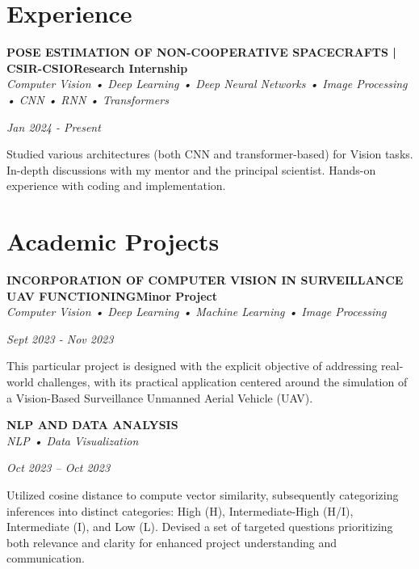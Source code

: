 \documentclass[letterpaper,10pt]{article}
\newcommand{\heading}[2]{
  \hspace{10pt}#1\hfill#2\\
}
\newcommand{\headingBf}[2]{
  \heading{\textbf{#1}}{\textbf{#2}}
}
\newcommand{\headingIt}[2]{
  \heading{\textit{#1}}{\textit{#2}}
}
\newenvironment{resume_list}{
  \vspace{-7pt}
  \begin{itemize}[itemsep=-2px, parsep=1pt, leftmargin=30pt]
}{
  \end{itemize}
}
\begin{document}

  \section{Experience}

  \headingBf{POSE ESTIMATION OF NON-COOPERATIVE SPACECRAFTS | CSIR-CSIO}{Research Internship}
  \textit{Computer Vision • Deep Learning • Deep Neural Networks • Image Processing • CNN • RNN • Transformers}
  \headingIt{Jan 2024 - Present}{}
  \begin{resume_list}
    \item Studied various architectures (both CNN and transformer-based) for Vision tasks. In-depth discussions with my mentor and the principal scientist. Hands-on experience with coding and implementation.
  \end{resume_list}

  \vspace{1em}


  \section{Academic Projects}
  \headingBf{INCORPORATION OF COMPUTER VISION IN SURVEILLANCE UAV FUNCTIONING}{Minor Project}
  \textit{Computer Vision • Deep Learning • Machine Learning • Image Processing}
  \headingIt{Sept 2023 - Nov 2023}{}
  \begin{resume_list}
    \item This particular project is designed with the explicit objective of addressing real-world challenges, with its practical application centered around the simulation of a Vision-Based Surveillance Unmanned Aerial Vehicle (UAV).
  \end{resume_list}

  \vspace{1em}

  \headingBf{NLP AND DATA ANALYSIS}{}
  \textit{NLP • Data Visualization}
  \headingIt{Oct 2023 – Oct 2023}{}
  \begin{resume_list}
    \item Utilized cosine distance to compute vector similarity, subsequently categorizing inferences into distinct categories: High (H), Intermediate-High (H/I), Intermediate (I), and Low (L). Devised a set of targeted questions prioritizing both relevance and clarity for enhanced project understanding and communication.
  \end{resume_list}
  
\end{document}
